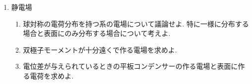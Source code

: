 \documentclass[11pt,a4paper]{jarticle}
\title{}
\author{}
\date{}
\begin{document}
\maketitle
\begin{enumerate}
    \item 静電場
    \begin{enumerate}
        \item 球対称の電荷分布を持つ系の電場について議論せよ. 特に一様に分布する場合と表面にのみ分布する場合について考えよ.
        \item 双極子モーメントが十分遠くで作る電場を求めよ.
        \item 電位差が与えられているときの平板コンデンサーの作る電場と表面に作る電荷を求めよ.
    \end{enumerate}
\end{enumerate}
\end{document}
